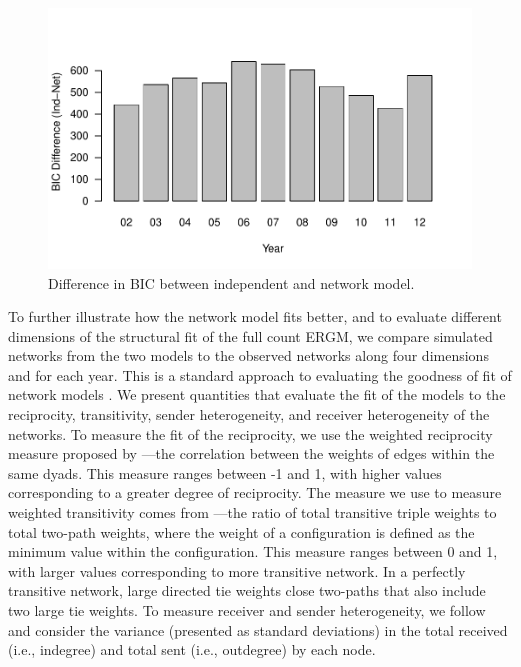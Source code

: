 \documentclass[reqno,onecolumn,letterpaper,12pt]{article}
\begin{document}
\begin{figure}[!h]
\centering
\includegraphics[scale=.75]{figures/BICdiff.pdf} \vspace{-.5cm}
\caption{\label{fig:bic} Difference in BIC between independent and network model.}
\end{figure}


To further illustrate how the network model fits better, and to evaluate different dimensions of the structural fit of the full count ERGM, we compare simulated networks from the two models to the observed networks along four dimensions and for each year.  This is a standard approach to evaluating the goodness of fit of network models \citep[e.g., ][]{krivitsky2008fitting,hunter2008goodness}. We present quantities that evaluate the fit of the models to the reciprocity, transitivity, sender heterogeneity, and receiver heterogeneity of the networks. To measure the fit of the reciprocity, we use the weighted reciprocity measure proposed by \cite{garlaschelli2004patterns}---the correlation between the weights of edges within the same dyads. This measure ranges between -1 and 1, with higher values corresponding to a greater degree of reciprocity.  The measure we use to measure weighted transitivity comes from \cite{opsahl2009clustering}---the ratio of total transitive triple weights to total two-path weights, where the weight of a configuration is defined as the minimum value within the configuration. This measure ranges between 0 and 1, with larger values corresponding to more transitive network. In a perfectly transitive network, large directed tie weights close two-paths that also include two large tie weights.  To measure receiver and sender heterogeneity, we follow \citep{minhas2019inferential} and consider the variance (presented as standard deviations) in the total received (i.e., indegree) and total sent (i.e., outdegree) by each node.
\end{document}
